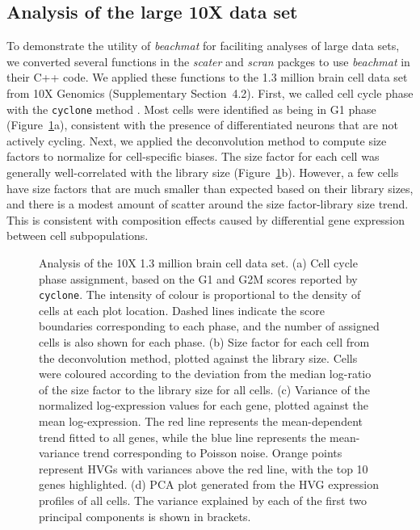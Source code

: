 \documentclass[10pt,letterpaper]{article}
\newcommand{\suppsecrealtenx}{4.2}
\newcommand{\beachmat}{\textit{beachmat}}
\newcommand{\code}[1]{\texttt{#1}}
\begin{document}
\subsection*{Analysis of the large 10X data set}
To demonstrate the utility of \beachmat{} for faciliting analyses of large data sets, we converted several functions in the \textit{scater} \cite{mccarthy2017scater} and \textit{scran} packges \cite{lun2016stepbystep} to use \beachmat{} in their C++ code.
We applied these functions to the 1.3 million brain cell data set from 10X Genomics (Supplementary Section~\suppsecrealtenx{}).
First, we called cell cycle phase with the \code{cyclone} method \cite{scialdone2015computational}. 
Most cells were identified as being in G1 phase (Figure~\ref{fig:tenx}a), consistent with the presence of differentiated neurons that are not actively cycling.
Next, we applied the deconvolution method \cite{lun2016pooling} to compute size factors to normalize for cell-specific biases.
The size factor for each cell was generally well-correlated with the library size (Figure~\ref{fig:tenx}b).
However, a few cells have size factors that are much smaller than expected based on their library sizes, and there is a modest amount of scatter around the size factor-library size trend.
This is consistent with composition effects \cite{robinson2010scaling} caused by differential gene expression between cell subpopulations.

\begin{figure}[b]
    \caption{Analysis of the 10X 1.3 million brain cell data set.
        (a) Cell cycle phase assignment, based on the G1 and G2M scores reported by \code{cyclone}.
        The intensity of colour is proportional to the density of cells at each plot location.
        Dashed lines indicate the score boundaries corresponding to each phase, and the number of assigned cells is also shown for each phase.
        (b) Size factor for each cell from the deconvolution method, plotted against the library size.
        Cells were coloured according to the deviation from the median log-ratio of the size factor to the library size for all cells.
        (c) Variance of the normalized log-expression values for each gene, plotted against the mean log-expression.
        The red line represents the mean-dependent trend fitted to all genes, while the blue line represents the mean-variance trend corresponding to Poisson noise.
        Orange points represent HVGs with variances above the red line, with the top 10 genes highlighted.
        (d) PCA plot generated from the HVG expression profiles of all cells.
        The variance explained by each of the first two principal components is shown in brackets.
    }
    \label{fig:tenx}
\end{figure}
\end{document}
